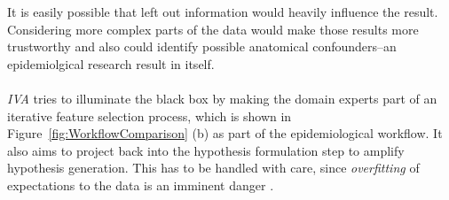 \documentclass[journal]{style/vgtc} 			          %
\begin{document}
%
It is easily possible that left out information would heavily influence the result.
%
Considering more complex parts of the data would make those results more trustworthy and also could identify possible anatomical confounders--an epidemiolgical research result in itself.
\\\\
\emph{IVA} tries to illuminate the black box by making the domain experts part of an iterative feature selection process, which is shown in Figure~\ref{fig:WorkflowComparison} (b) as part of the epidemiological workflow.
%
%
It also aims to project back into the hypothesis formulation step to amplify hypothesis generation.
%
This has to be handled with care, since \emph{overfitting} of expectations to the data is an imminent danger \cite{Turkay2013}.
\end{document}
